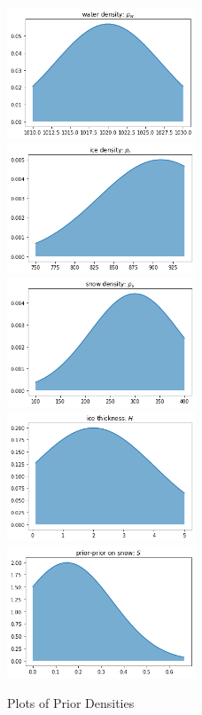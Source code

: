\documentclass[12pt, letterpaper]{article}
\begin{document}
\begin{figure}[p]
\caption{Plots of Prior Densities}
\includegraphics[width=0.5\textwidth]{prior_rw}
\includegraphics[width=0.5\textwidth]{prior_ri}
\includegraphics[width=0.5\textwidth]{prior_rs}
\includegraphics[width=0.5\textwidth]{prior_H}
\includegraphics[width=0.5\textwidth]{prior_S}
\end{figure}
\end{document}

